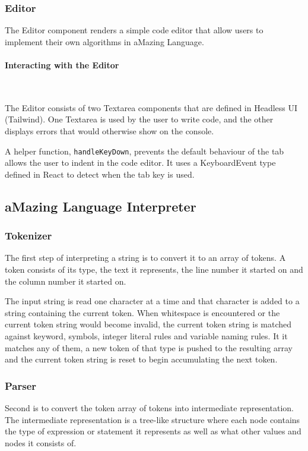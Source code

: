 \subsubsection{Editor}

The Editor component renders a simple code editor that allow users to implement their own algorithms in aMazing Language.

\paragraph{Interacting with the Editor} \

The Editor consists of two Textarea components that are defined in Headless UI (Tailwind). One Textarea is used by the user to write code, and the other displays errors that would otherwise show on the console.

A helper function, \texttt{handleKeyDown}, prevents the default behaviour of the tab allows the user to indent in the code editor. It uses a KeyboardEvent type defined in React to detect when the tab key is used.

\subsection{aMazing Language Interpreter}

\subsubsection{Tokenizer}

The first step of interpreting a string is to convert it to an array of tokens. A token consists of its type, the text it represents, the line number it started on and the column number it started on.

The input string is read one character at a time and that character is added to a string containing the current token. When whitespace is encountered or the current token string would become invalid, the current token string is matched against keyword, symbols, integer literal rules and variable naming rules. It it matches any of them, a new token of that type is pushed to the resulting array and the current token string is reset to begin accumulating the next token.

\subsubsection{Parser}

Second is to convert the token array of tokens into intermediate representation. The intermediate representation is a tree-like structure where each node contains the type of expression or statement it represents as well as what other values and nodes it consists of.

